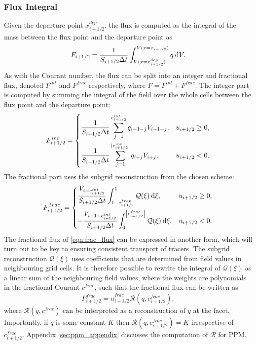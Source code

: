 \documentclass[11pt,a4paper]{article}
\newcommand{\dx}[1]{\hspace{0.75mm}\mathrm{d}{#1}}
\begin{document}
\subsubsection{Flux Integral} \label{sec:ffsl_flux_integral}

Given the departure point $x^{dep}_{i+1/2}$, the flux is computed as the integral of the mass between the flux point and the departure point as
\begin{equation}
F_{i+1/2} = 
\frac{1}{S_{i+1/2}\Delta{t}} \int^{V(x=x_{i+1/2})}_{V(x=x^{dep}_{i+1/2})} q \dx{V}.  
\end{equation}
As with the Courant number, the flux can be split into an integer and fractional flux, denoted $F^{int}$ and $F^{frac}$ respectively, where $F = F^{int} + F^{frac}$.
The integer part is computed by summing the integral of the field over the whole cells between the flux point and the departure point:
\begin{equation}
    F^{int}_{i+1/2} = 
    \begin{dcases}
        \frac{1}{S_{i+1/2}\Delta{t}}\sum_{j=1}^{c_{i+1/2}^{int}} q_{i+1-j} V_{i+1-j}, & u_{i+1/2} \geq 0, \\
        \frac{1}{S_{i+1/2}\Delta{t}}\sum_{j=1}^{|c_{i+1/2}^{int}|} q_{i+j} V_{i+j}, & u_{i+1/2} < 0.
    \end{dcases}
\end{equation}
The fractional part uses the subgrid reconstruction from the chosen scheme:
\begin{equation} \label{eqn:frac_flux}
    F^{frac}_{i+1/2} = 
    \begin{dcases}
        \frac{V_{i-c^{int}_{i+1/2}}}{S_{i+1/2}\Delta t} \int^{1}_{1-c_{i+1/2}^{frac}} \mathcal{Q}(\xi) \dx{\xi}, & u_{i+1/2} \ge 0, \\
        -\frac{V_{i+1+c^{int}_{i+1/2}}}{S_{i+1/2}\Delta t} \int^{\left| c_{i+1/2}^{frac}\right|}_{0} \mathcal{Q}(\xi) \dx{\xi}, & u_{i+1/2} < 0.  
    \end{dcases}
\end{equation}
The fractional flux of \eqref{eqn:frac_flux} can be expressed in another form, which will turn out to be key to ensuring consistent transport of tracers. 
The subgrid reconstruction $\mathcal{Q}(\xi)$ uses coefficients that are determined from field values in neighbouring grid cells.
It is therefore possible to rewrite the integral of $\mathcal{Q}(\xi)$ as a linear sum of the neighbouring field values, where the weights are polynomials in the fractional Courant $c^{frac}$, such that the fractional flux can be written as
\begin{equation} \label{eqn:consistent_flux}
F_{i+1/2}^{frac} = \widehat{u}_{i+1/2}^{frac} \mathcal{R}(q,c_{i+1/2}^{frac}),
\end{equation}
where $\mathcal{R}(q,c^{frac})$ can be interpreted as a reconstruction of $q$ at the facet.
Importantly, if $q$ is some constant $K$ then $\mathcal{R}(q,c_{i+1/2}^{frac})=K$ irrespective of $c_{i+1/2}^{frac}$.
Appendix \ref{sec:ppm_appendix} discusses the computation of $\mathcal{R}$ for PPM.
\end{document}
